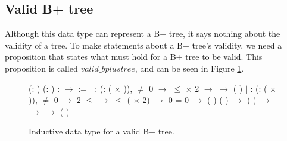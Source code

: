 \subsection{Valid B+ tree}
\label{subsec:Valid_bplustree}
Although this data type can represent a B+ tree, it says nothing about the validity of a tree. To make statements about a B+ tree's validity, we need a proposition that states what must hold for a B+ tree to be valid. This proposition is called $valid\_bplustree$, and can be seen in Figure \ref{fig:inductive_valid_bplustree}.

\begin{figure}
\centering
\begin{coqdoccode}
  (: ) (: ) :    \ensuremath{\rightarrow}  :=\coqdoceol
\coqdocindent{1.00em}
\ensuremath{|}   : \coqdockw{\ensuremath{\forall}} (:  ( \ensuremath{\times} )), \coqdoceol
\coqdocindent{11.00em}
 \ensuremath{\not=} 0 \ensuremath{\rightarrow}\coqdoceol
\coqdocindent{11.00em}
  \ensuremath{\le}  \ensuremath{\times} 2 \ensuremath{\rightarrow}\coqdoceol
\coqdocindent{11.00em}
  \ensuremath{\rightarrow}  \coqdoceol
\coqdocindent{11.00em}
   (   )\coqdoceol
\coqdocindent{1.00em}
\ensuremath{|}  : \coqdockw{\ensuremath{\forall}} (:  ( \ensuremath{\times}   )),\coqdoceol
\coqdocindent{11.00em}
 \ensuremath{\not=} 0 \ensuremath{\rightarrow} \coqdoceol
\coqdocindent{11.00em}
2 \ensuremath{\le}   \ensuremath{\rightarrow} \coqdoceol
\coqdocindent{11.00em}
  \ensuremath{\le}  ( \ensuremath{\times} 2) \ensuremath{\rightarrow}\coqdoceol
\coqdocindent{11.00em}
 0  =  0 \ensuremath{\rightarrow} \coqdoceol
\coqdocindent{11.00em}
 (  ) (  )  \ensuremath{\rightarrow}\coqdoceol
\coqdocindent{11.00em}
 (  )   \ensuremath{\rightarrow}\coqdoceol
\coqdocindent{11.00em}
  \ensuremath{\rightarrow}  \coqdoceol
\coqdocindent{11.00em}
    \ensuremath{\rightarrow}\coqdoceol
\coqdocindent{11.00em}
   (   )   \coqdoceol
\end{coqdoccode}
\caption{Inductive data type for a valid B+ tree.}
\label{fig:inductive_valid_bplustree}
\end{figure}

